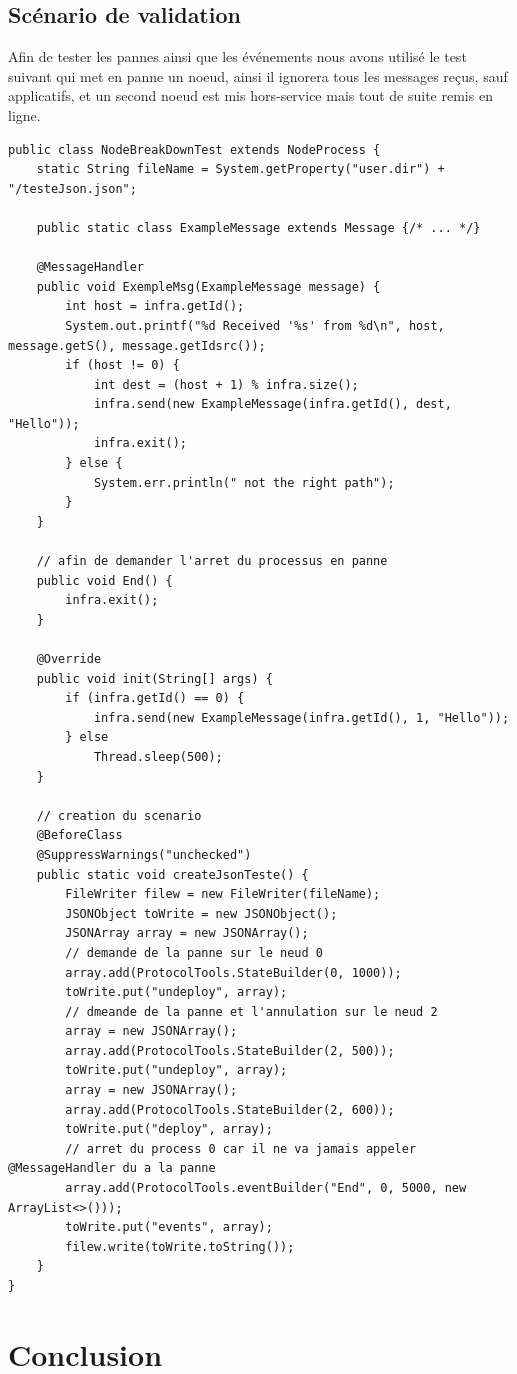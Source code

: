 \documentclass{article}
\begin{document}
			\subsection{Scénario de validation}
			Afin de tester les pannes ainsi que les événements nous avons utilisé le test suivant qui met en panne un noeud, ainsi il ignorera tous les messages reçus, sauf applicatifs, et un second noeud est mis hors-service mais tout de suite remis en ligne.
			\begin{lstlisting}
public class NodeBreakDownTest extends NodeProcess {
	static String fileName = System.getProperty("user.dir") + "/testeJson.json";

	public static class ExampleMessage extends Message {/* ... */}

	@MessageHandler
	public void ExempleMsg(ExampleMessage message) {
		int host = infra.getId();
		System.out.printf("%d Received '%s' from %d\n", host, message.getS(), message.getIdsrc());
		if (host != 0) {
			int dest = (host + 1) % infra.size();
			infra.send(new ExampleMessage(infra.getId(), dest, "Hello"));
			infra.exit();
		} else {
			System.err.println(" not the right path");
		}
	}

	// afin de demander l'arret du processus en panne
	public void End() {
		infra.exit();
	}

	@Override
	public void init(String[] args) {
		if (infra.getId() == 0) {
			infra.send(new ExampleMessage(infra.getId(), 1, "Hello"));
		} else
			Thread.sleep(500);
	}

	// creation du scenario
	@BeforeClass
	@SuppressWarnings("unchecked")
	public static void createJsonTeste() {
		FileWriter filew = new FileWriter(fileName);
		JSONObject toWrite = new JSONObject();
		JSONArray array = new JSONArray();
		// demande de la panne sur le neud 0
		array.add(ProtocolTools.StateBuilder(0, 1000));
		toWrite.put("undeploy", array);
		// dmeande de la panne et l'annulation sur le neud 2
		array = new JSONArray();
		array.add(ProtocolTools.StateBuilder(2, 500));
		toWrite.put("undeploy", array);
		array = new JSONArray();
		array.add(ProtocolTools.StateBuilder(2, 600));
		toWrite.put("deploy", array);
		// arret du process 0 car il ne va jamais appeler @MessageHandler du a la panne
		array.add(ProtocolTools.eventBuilder("End", 0, 5000, new ArrayList<>()));
		toWrite.put("events", array);
		filew.write(toWrite.toString());
	}
}
		\end{lstlisting}
		\newpage
		\section{Conclusion}
\end{document}
